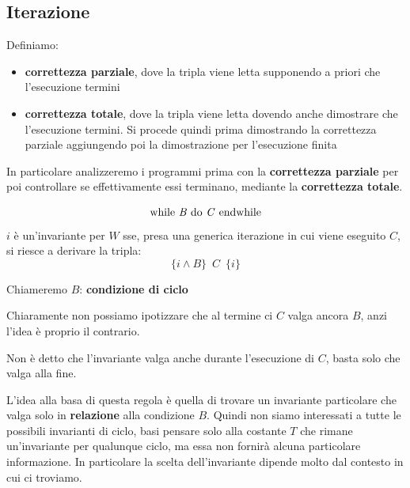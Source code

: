 			\subsection{Iterazione}
			\begin{definizione}
				Definiamo:
				\begin{itemize}
					\item \textbf{correttezza parziale}, dove la tripla viene letta supponendo a
					      priori che l'esecuzione termini
					\item \textbf{correttezza totale}, dove la tripla viene letta dovendo anche
					      dimostrare che l'esecuzione termini. Si procede quindi prima dimostrando la
					      correttezza parziale aggiungendo poi la dimostrazione per l'esecuzione
					      finita
				\end{itemize}
			\end{definizione} \vspace{5mm} %
			In particolare analizzeremo i programmi prima con la \textbf{correttezza parziale} per poi controllare se effettivamente essi terminano, mediante la \textbf{correttezza totale}.\\
			\begin{definizione}[Invariante]
			
			\[\mbox{ while \textit{B} do 
				\textit{C} endwhile }\]
				$i$ è un'invariante per $W$ sse, presa una generica iterazione in cui viene eseguito $C$, si riesce a derivare la tripla:
				\[\{i\land B\}\,\,\, C\,\,\,\{i\}\]
					\begin{corollario}
			Chiameremo $B$: \textbf{condizione di ciclo}
			\end{corollario}
			\begin{nota}
			Chiaramente non possiamo ipotizzare che al termine ci $C$ valga ancora $B$, anzi l'idea è proprio il contrario.
			\end{nota}
			\begin{nota}
			Non è detto che l'invariante valga anche durante l'esecuzione di $C$, basta solo che valga alla fine.
			\end{nota}
			\end{definizione}
				L'idea alla basa di questa regola è quella di trovare un invariante particolare che valga solo in \textbf{relazione} alla condizione $B$. Quindi non siamo interessati a tutte le possibili invarianti di ciclo, basi pensare solo alla costante $T$ che rimane un'invariante per qualunque ciclo, ma essa non fornirà alcuna particolare informazione. In particolare la scelta dell'invariante dipende molto dal contesto in cui ci troviamo.
